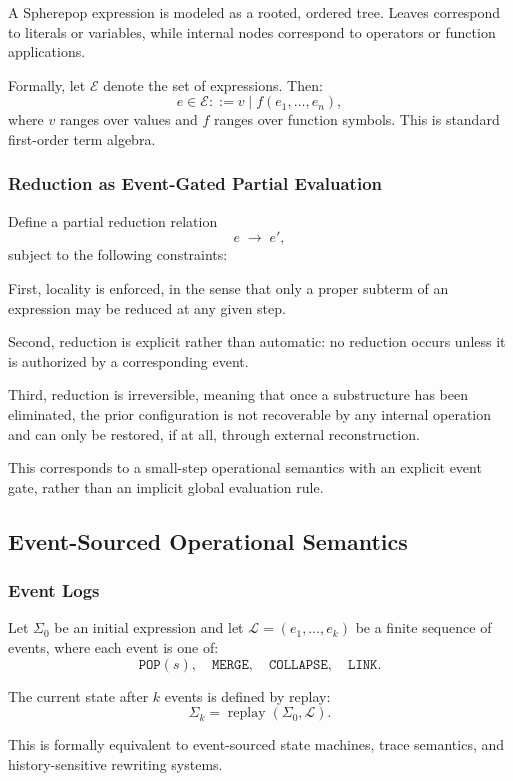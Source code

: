 \documentclass[11pt]{article}
\begin{document}
A Spherepop expression is modeled as a rooted, ordered tree. Leaves correspond to literals or variables, while internal nodes correspond to operators or function applications.

Formally, let $\mathcal{E}$ denote the set of expressions. Then:
\[
e \in \mathcal{E} ::= v \mid f(e_1,\dots,e_n),
\]
where $v$ ranges over values and $f$ ranges over function symbols. This is standard first-order term algebra.

\subsubsection{Reduction as Event-Gated Partial Evaluation}

Define a partial reduction relation
\[
e \;\rightarrow\; e',
\]
subject to the following constraints:

First, locality is enforced, in the sense that only a proper subterm of an expression may be reduced at any given step.

Second, reduction is explicit rather than automatic: no reduction occurs unless it is authorized by a corresponding event.

Third, reduction is irreversible, meaning that once a substructure has been eliminated, the prior configuration is not recoverable by any internal operation and can only be restored, if at all, through external reconstruction. 

This corresponds to a small-step operational semantics with an explicit event gate, rather than an implicit global evaluation rule.

\subsection{Event-Sourced Operational Semantics}

\subsubsection{Event Logs}

Let $\Sigma_0$ be an initial expression and let $\mathcal{L} = (e_1,\dots,e_k)$ be a finite sequence of events, where each event is one of:
\[
\texttt{POP}(s),\quad \texttt{MERGE},\quad \texttt{COLLAPSE},\quad \texttt{LINK}.
\]

The current state after $k$ events is defined by replay:
\[
\Sigma_k = \operatorname{replay}(\Sigma_0,\mathcal{L}).
\]

This is formally equivalent to event-sourced state machines, trace semantics, and history-sensitive rewriting systems.
\end{document}
